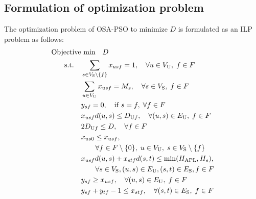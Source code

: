 \documentclass[10pt, letterpaper]{IEEEtran}
\begin{document}
\begin{CJK}{UTF8}{ipxm}
\subsection{Formulation of optimization problem}
The optimization problem of OSA-PSO to minimize $D$ is formulated as an ILP problem as follows:
\begin{subequations} \label{OSA-PSO}
  \begin{align}
  \text{Objective}&\text{ min}\quad D \label{OSA-PSO_a} \\
  \rm{s.t.} \quad
  &\sum_{s \in V_{\rm{S}} \setminus \{f\}} x_{usf} = 1, \quad \forall u \in V_{\rm{U}}, \; f \in F \label{OSA-PSO_b} \\
  &\sum_{u \in V_{\rm{U}}} x_{usf} = M_s, \quad \forall s \in V_{\rm{S}}, \; f \in F \label{OSA-PSO_b'} \\  %
  &y_{sf} = 0, \quad \mathrm{if} \; s = f, \; \forall f \in F \label{OSA-PSO_c} \\  %
  &x_{usf}d(u,s) \le D_{\mathrm{U}f}, \quad \forall (u,s) \in E_{\rm{U}}, \; f \in F \label{OSA-PSO_d} \\
  &2D_{\mathrm{U}f} \le D, \quad \forall f \in F \label{OSA-PSO_e} \\
  &x_{us0} \le x_{usf}, \notag \\
  &\qquad \forall f \in F \setminus \{0\}, \; u \in V_{\rm{U}}, \; s \in V_{\rm{S}} \setminus \{f\} \label{OSA-PSO_f} \\
  &x_{usf}d(u,s) + x_{stf}d(s,t) \le \min(H_{\rm APL},H_s), \notag \\
  &\qquad \forall s \in V_{\rm{S}}, (u,s) \in E_{\rm{U}}, (s,t) \in E_{\rm{S}}, f \in F \label{OSA-PSO_g} \\
  &y_{sf} \geq x_{usf}, \quad \forall (u,s) \in E_{\rm{U}}, \; f \in F \label{OSA-PSO_h} \\
  &y_{sf} + y_{tf} - 1 \le x_{stf}, \quad \forall (s,t) \in E_{\rm{S}}, \; f \in F \label{OSA-PSO_i} \\

\end{align}
\end{subequations}
\end{CJK}
\end{document}
